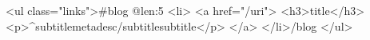 <ul class="links">{{#blog @{len:5} }}
	<li>
		<a href="/{{uri}}">
			<h3>{{title}}</h3>
			<p>{{^subtitle}}{{metadesc}}{{/subtitle}}{{subtitle}}</p>
		</a>
	</li>{{/blog}}
</ul>